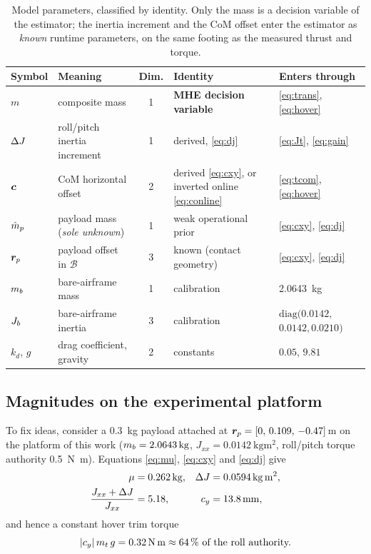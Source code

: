 \begin{table}[t]
\caption{Model parameters, classified by identity. Only the mass is a
decision variable of the estimator; the inertia increment and the CoM
offset enter the estimator as \emph{known} runtime parameters, on the same
footing as the measured thrust and torque.}
\label{tab:params}
\centering
\footnotesize
\begin{tabular}{@{}l p{} c p{} p{}@{}}
\toprule
Symbol & Meaning & Dim. & Identity & Enters through \\
\midrule
$m$ & composite mass & 1 & \textbf{MHE decision variable} & \eqref{eq:trans}, \eqref{eq:hover} \\
$\Delta J$ & roll/pitch inertia increment & 1 & derived, \eqref{eq:dj} & \eqref{eq:Jt}, \eqref{eq:gain} \\
$\bm{c}$ & CoM horizontal offset & 2 & derived \eqref{eq:cxy}, or inverted online \eqref{eq:conline} & \eqref{eq:tcom}, \eqref{eq:hover} \\
\midrule
$\hat{m}_p$ & payload mass (\emph{sole unknown}) & 1 & weak operational prior & \eqref{eq:cxy}, \eqref{eq:dj} \\
$\bm{r}_p$ & payload offset in $\mathcal{B}$ & 3 & known (contact geometry) & \eqref{eq:cxy}, \eqref{eq:dj} \\
\midrule
$m_b$ & bare-airframe mass & 1 & calibration & \SI{2.0643}{\kg} \\
$J_b$ & bare-airframe inertia & 3 & calibration & $\mathrm{diag}(0.0142,$ $0.0142, 0.0210)$ \\
$k_d$, $g$ & drag coefficient, gravity & 2 & constants & $0.05$, $9.81$ \\
\bottomrule
\end{tabular}
\end{table}

\subsection{Magnitudes on the experimental platform}\label{sec:model:magnitudes}

To fix ideas, consider a \SI{0.3}{\kg} payload attached at
$\bm{r}_p = [0,\, 0.109,\, -0.47]\,$\si{\meter} on the platform of this work
($\mb = \SI{2.0643}{\kg}$, $J_{xx} = \SI{0.0142}{\kg\meter\squared}$,
roll/pitch torque authority \SI{0.5}{\newton\meter}). Equations
\eqref{eq:mu}, \eqref{eq:cxy} and \eqref{eq:dj} give
\begin{align}
\mu &= \SI{0.262}{\kg}, &
\dJ &= \SI{0.0594}{\kg\meter\squared}, \nonumber \\
\frac{J_{xx} + \dJ}{J_{xx}} &= 5.18, &
c_y &= \SI{13.8}{\milli\meter},
\label{eq:numbers}
\end{align}
and hence a constant hover trim torque
\begin{equation}
|c_y|\, m_t\, g = \SI{0.32}{\newton\meter} \approx \SI{64}{\percent}\ \text{of the roll authority.}
\label{eq:trimtorque}
\end{equation}

